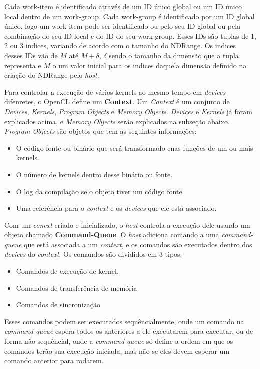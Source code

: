 Cada work-item é identificado através de um ID único global ou um ID único local dentro de um work-group. Cada work-group é identificado
por um ID global único, logo um work-item pode ser identificado ou pelo seu ID global ou pela combinação do seu ID local e do ID do seu 
work-group. Esses IDs são tuplas de 1, 2 ou 3 indices, variando de acordo com o tamanho do NDRange. Os indices desses IDs vão de $M$ até
$M+\delta$, $\delta$ sendo o tamanho da dimensão que a tupla representa e $M$ o um valor inicial para os indices daquela dimensão definido
na criação do NDRange pelo \textit{host}.

Para controlar a execução de vários kernels ao mesmo tempo em \textit{devices} difenretes, o OpenCL define um \textbf{Context}.
Um \textit{Context} é um conjunto de \textit{Devices}, \textit{Kernels}, \textit{Program Objects} e \textit{Memory Objects}.
\textit{Devices} e \textit{Kernels} já foram explicados acima, e \textit{Memory Objects} serão explicados na subseção abaixo.
\textit{Program Objects} são objetos que tem as seguintes informações:
\begin{itemize}
  \item O código fonte ou binário que será transformado enas funções de um ou mais kernels.
  \item O número de kernels dentro desse binário ou fonte.
  \item O log da compilação se o objeto tiver um código fonte.
  \item Uma referência para o \textit{context} e os \textit{devices} que ele está associado.
\end{itemize}

Com um \textit{conext} criado e inicializado, o \textit{host} controla a execução dele usando um objeto chamado \textbf{Command-Queue}.
O \textit{host} adiciona comando a uma \textit{command-queue} que está associada a um \textit{context}, e os comandos são executados
dentro dos \textit{devices} do \textit{context}. Os comandos são divididos em 3 tipos:
\begin{itemize}
  \item Comandos de execução de kernel.
  \item Comandos de transferência de memória
  \item Comandos de sincronização
\end{itemize}
Esses comandos podem ser executados sequêncialmente, onde um comando na \textit{command-queue} espera todos os anteriores a ele executarem para
executar, ou de forma não sequêncial, onde a \textit{command-queue} só define a ordem em que os comandos terão sua execução iniciada, mas não se 
eles devem esperar um comando anterior para rodarem.

